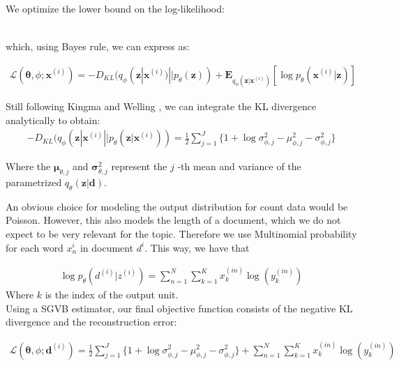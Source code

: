 \documentclass{report}
\begin{document}
We optimize the lower bound on the log-likelihood: 

\begin{align}
\end{align}

which, using Bayes rule, we can express as:

\begin{align}
\mathcal{L}(\mathbf{\theta}, \phi; \mathbf{x}^{(i)}) = -D_{KL}(q_\phi (\mathbf{z}| \mathbf{x}^{(i)})||p_\theta (\mathbf{z})) + \mathbf{E}_{q_\phi(\mathbf{z}|\mathbf{x}^{(i)})}[\log p_\theta (\mathbf{x}^{(i)}|\mathbf{z})]
\end{align}



Still following Kingma and Welling \cite{kingma2013auto}, we can integrate the KL divergence analytically to obtain: \\


\begin{align}
- D_{KL}(q_\phi (\mathbf{z}| \mathbf{x}^{(i)}||p_\theta (\mathbf{z}| \mathbf{x}^{(i)})) = \frac{1}{2}\sum\limits_{j=1}^{J}\{1+\log \sigma_{\phi ,j}^2 - \mu_{\phi,j}^2 - \sigma_{\phi ,j}^2\}
\end{align}

Where the $\mathbf{\mu}_{\theta,j}$ and $\mathbf{\sigma}_{\theta,j}^2$ represent the $j$ -th mean and variance of the parametrized $q_\theta(\mathbf{z}|\mathbf{d})$.

An obvious choice for modeling the output distribution for count data would be Poisson. However, this also models the length of a document, which we do not expect to be very relevant for the topic. Therefore we use Multinomial probability for each word $x_n^{i}$ in document $d^{i}$. This way, we have that

\begin{align}
\log p_{\theta}(d^{(i)}|z^{(i)}) = 
\sum_{n=1}^N
\sum_{k=1}^K x_k^{(in)} \log (y_k^{(in)})
\end{align}
Where $k$ is the index of the output unit.\\


Using a SGVB estimator, our final objective function consists of the negative KL divergence and the reconstruction error:

\begin{align}
\mathcal{L}(\mathbf{\theta}, \phi; \mathbf{d}^{(i)}) = \frac{1}{2}\sum\limits_{j=1}^{J}\{1+\log \sigma_{\phi ,j}^2 - \mu_{\phi,j}^2 - \sigma_{\phi ,j}^2\} 
+ \sum_{n=1}^N
\sum_{k=1}^K x_k^{(in)} \log (y_k^{(in)})
\end{align}
\end{document}
